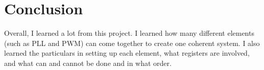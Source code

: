\documentclass{article}
\begin{document}
\section{Conclusion}
Overall, I learned a lot from this project. I learned how many
different elements (such as PLL and PWM) can come together to
create one coherent system. I also learned the particulars in
setting up each element, what registers are involved, and
what can and cannot be done and in what order.
\end{document}
